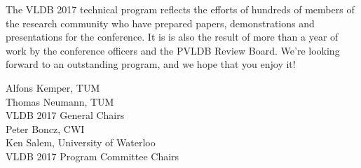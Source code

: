 The VLDB 2017 technical program reflects the efforts of hundreds of members of the research community
who have prepared papers, demonstrations and presentations for the conference.
It is is also the result of more than a year of work by the conference officers and the PVLDB Review Board.
We're looking forward to an outstanding program, and we hope that you enjoy it!

\vspace{2mm}
Alfons Kemper, TUM \\
Thomas Neumann, TUM \\
VLDB 2017 General Chairs \\

Peter Boncz, CWI \\
Ken Salem, University of Waterloo \\
VLDB 2017 Program Committee Chairs